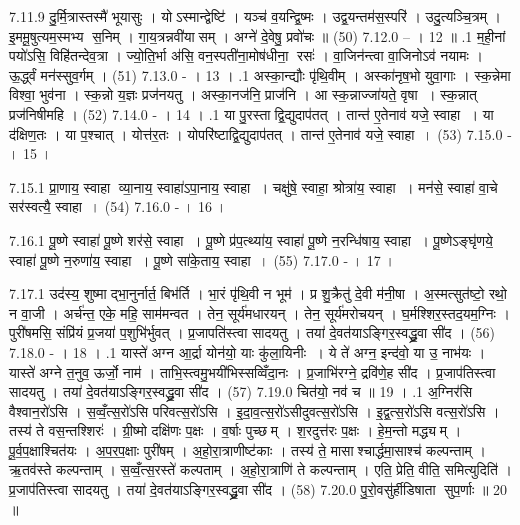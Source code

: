 7.11.9
दु॒र्मि॒त्रास्तस्मै॑ भूयासुः । योऽस्मान्द्वेष्टि॑ । यञ्च॑ व॒यन्द्वि॒ष्मः । उद्व॒यन्तम॑स॒स्परि॑ । उदु॒त्यञ्चि॒त्रम् । इ॒ममू॒षुत्यम॒स्मभ्य स॒निम् । गा॒य॒त्रन्नवी॑यासम् । अग्ने॑ दे॒वेषु॒ प्रवो॑चः ॥ (50)
7.12.0
-- । 12 ॥
.1
म॒ही॒नां पयो॑ऽसि॒ विहि॑तन्देव॒त्रा । ज्यो॒ति॒र्भा अ॑सि॒ वन॒स्पती॑ना॒मोष॑धीना॒ रसः॑ । वा॒जिन॑न्त्वा वा॒जिनोऽव॑ नयामः । ऊ॒र्द्ध्वं मन॑स्सुव॒र्गम् । (51)
7.13.0
- । 13 ।
.1
अस्का॒न्द्यौः पृ॑थि॒वीम् । अस्का॑नृष॒भो युवा॒गाः । स्क॒न्नेमा विश्वा॒ भुव॑ना । स्क॒न्नो य॒ज्ञः प्रज॑नयतु । अस्का॒नज॑नि॒ प्राज॑नि । आ स्क॒न्नाज्जा॑यते॒ वृषा । स्क॒न्नात् प्रज॑निषीमहि । (52)
7.14.0
- । 14 ।
.1
या पु॒रस्ताद्वि॒द्युदाप॑तत् । तान्त॑ ए॒तेनाव॑ यजे॒ स्वाहा । या द॑क्षिण॒तः । या प॒श्चात् । योत्त॑र॒तः । योपरि॑ष्टाद्वि॒द्युदाप॑तत् । तान्त॑ ए॒तेनाव॑ यजे॒ स्वाहा । (53)
7.15.0
- । 15 ।
\anuvakamend

7.15.1
प्रा॒णाय॒ स्वाहा व्या॒नाय॒ स्वाहा॑ऽपा॒नाय॒ स्वाहा । चक्षु॑षे॒ स्वाहा॒ श्रोत्रा॑य॒ स्वाहा । मन॑से॒ स्वाहा॑ वा॒चे सर॑स्वत्यै॒ स्वाहा । (54)
7.16.0
- । 16 ।
\anuvakamend


7.16.1
पू॒ष्णे स्वाहा॑ पू॒ष्णे शर॑से॒ स्वाहा । पू॒ष्णे प्र॑प॒त्थ्या॑य॒ स्वाहा॑ पू॒ष्णे न॒रन्धि॑षाय॒ स्वाहा । पू॒ष्णेऽङ्घृ॑णये॒ स्वाहा॑ पू॒ष्णे न॒रुणा॑य॒ स्वाहा । पू॒ष्णे सा॑के॒ताय॒ स्वाहा । (55)
7.17.0
- । 17 ।
\anuvakamend

7.17.1
उद॑स्य॒ शुष्माद्भा॒नुर्नार्त॒ बिभ॑र्ति । भा॒रं पृ॑थि॒वी न भूम॑ । प्र शु॒क्रैतु॑ दे॒वी म॑नी॒षा । अ॒स्मत्सुत॑ष्टो॒ रथो॒ न वा॒जी । अर्च॑न्त॒ एके॒ महि॒ साम॑मन्वत । तेन॒ सूर्य॑मधारयन् । तेन॒ सूर्य॑मरोचयन् । घ॒र्मश्शिर॒स्तद॒यम॒ग्निः । पुरी॑षमसि॒ संप्रि॑यं प्र॒जया॑ प॒शुभि॑र्भुवत् । प्र॒जापति॑स्त्वा सादयतु । तया॑ दे॒वत॑याऽङ्गिर॒स्वद्ध्रु॒वा सी॑द । (56)
7.18.0
- । 18 ।
.1
यास्ते॑ अग्न आ॒र्द्रा योन॑यो॒ याः कु॑ला॒यिनीः । ये ते॑ अग्न॒ इन्द॑वो॒ या उ॒ नाभ॑यः । यास्ते॑ अग्ने त॒नुव॒ ऊर्जो॒ नाम॑ । ताभि॒स्त्वमु॒भयी॑भिस्सव्विँदा॒नः । प्र॒जाभि॑रग्ने॒ द्रवि॑णे॒ह सी॑द । प्र॒जाप॑तिस्त्वा सादयतु । तया॑ दे॒वत॑याऽङ्गिर॒स्वद्ध्रु॒वा सी॑द । (57)
7.19.0
चित॑यो॒ नव॑ च ॥ 19 ।
.1
अ॒ग्निर॑सि वैश्वान॒रो॑ऽसि । स॒व्वँ॒त्स॒रो॑ऽसि परिवत्स॒रो॑ऽसि । इ॒दा॒व॒त्स॒रो॑ऽसीदुवत्स॒रो॑ऽसि । इ॒द्व॒त्स॒रो॑ऽसि वत्स॒रो॑ऽसि । तस्य॑ ते वस॒न्तश्शिरः॑ । ग्री॒ष्मो दक्षि॑णः प॒क्षः । व॒र्\mbox{}षाः पुच्छम् । श॒रदुत्त॑रः प॒क्षः । हे॒म॒न्तो मद्ध्यम् । पू॒र्व॒प॒क्षाश्चित॑यः । अ॒प॒र॒प॒क्षाः पुरी॑षम् । अ॒हो॒रा॒त्राणीष्ट॑काः । तस्य॑ ते॒ मासाश्चार्द्धमा॒साश्च॑ कल्पन्ताम् । ऋ॒तव॑स्ते कल्पन्ताम् । स॒व्वँ॒त्स॒रस्ते॑ कल्पताम् । अ॒हो॒रा॒त्राणि॑ ते कल्पन्ताम् । एति॒ प्रेति॒ वीति॒ समित्युदिति॑ । प्र॒जाप॑तिस्त्वा सादयतु । तया॑ दे॒वत॑याऽङ्गिर॒स्वद्ध्रु॒वा सी॑द । (58)
7.20.0
पु॒रो॒वसु॑र्\mbox{}हीडिषाता सुप॒र्णाः ॥ 20 ॥
\anuvakamend

